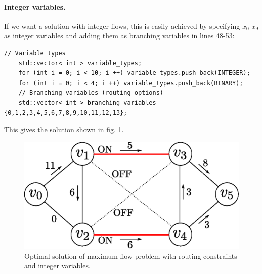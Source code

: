 \paragraph{Integer variables.} \label{sec:maxflowinteger} If we want a solution with integer flows, this is easily achieved by specifying $x_0$-$x_9$ as integer variables and adding them as branching variables in lines 48-53:
\begin{lstlisting}
// Variable types
    std::vector< int > variable_types;
    for (int i = 0; i < 10; i ++) variable_types.push_back(INTEGER);
    for (int i = 0; i < 4; i ++) variable_types.push_back(BINARY);
    // Branching variables (routing options)
    std::vector< int > branching_variables {0,1,2,3,4,5,6,7,8,9,10,11,12,13};
\end{lstlisting}
This gives the solution shown in fig. \ref{fig:flownetwork_sol3}.
\begin{figure}[H]
\centering
\includegraphics[scale=0.6]{figures/flownetwork_sol3.eps}
\caption{Optimal solution of maximum flow problem with routing constraints and integer variables.}
\label{fig:flownetwork_sol3}
\end{figure}

